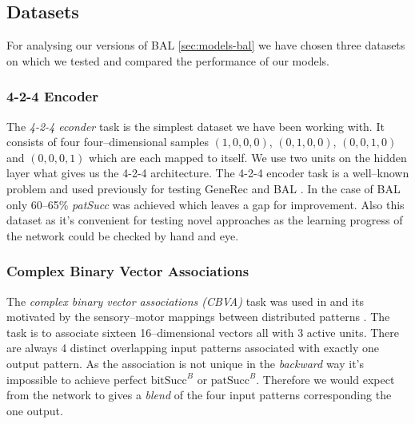 
\subsection{Datasets}  
\label{sec:sim-data} 

For analysing our versions of BAL \ref{sec:models-bal} we have chosen three datasets on which we tested and compared the performance of our models. 

\subsubsection{4-2-4 Encoder} 
\label{sec:datasets-auto4}


The \emph{4-2-4 econder} task is the simplest dataset we have been working with. It consists of four four--dimensional samples $(1,0,0,0)$, $(0,1,0,0)$, $(0,0,1,0)$ and $(0,0,0,1)$ which are each mapped to itself. We use two units on the hidden layer what gives us the 4-2-4 architecture. The 4-2-4 encoder task is a well--known problem and used previously for testing GeneRec \citep{o1996bio} and BAL \citep{farkas2013bal}. In the case of BAL only 60--65\% \emph{patSucc} was achieved which leaves a gap for improvement. Also this dataset as it's convenient for testing novel approaches as the learning progress of the network could be checked by hand and eye. 


\subsubsection{Complex Binary Vector Associations} 
\label{sec:datasets-k3}

The \emph{complex binary vector associations (CBVA)} task was used in \citet{farkas2013bal} and its motivated by the sensory--motor mappings between distributed patterns \citep{farkas2013bal}. The task is to associate sixteen 16--dimensional vectors all with 3 active units. There are always 4 distinct overlapping input patterns associated with exactly one output pattern. As the association is not unique in the \emph{backward} way it's impossible to achieve perfect $\mbox{bitSucc}^B$ or $\mbox{patSucc}^B$. Therefore we would expect from the network to gives a \emph{blend} of the four input patterns corresponding the one output. 

